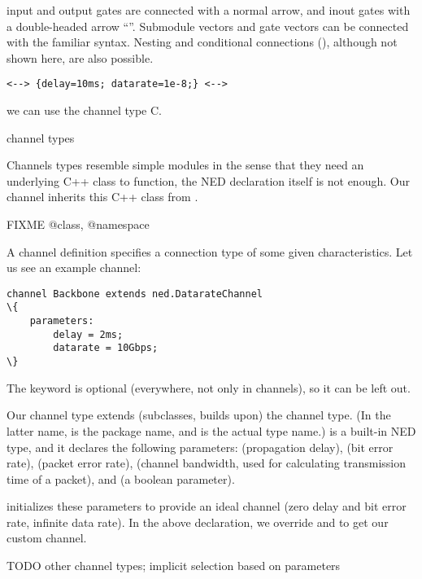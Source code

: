 input and output gates are connected with a normal arrow, and inout gates
with a double-headed arrow ``\ttt{<-->}''. Submodule vectors and gate
vectors can be connected with the familiar  syntax. Nesting and
conditional connections (), although not shown here, are also
possible.

\begin{Verbatim}
<--> {delay=10ms; datarate=1e-8;} <-->
\end{Verbatim}

we can use the channel type C.

channel types

Channels types resemble simple modules in the sense that they need an underlying
C++ class to function, the NED declaration itself is not enough. Our
 channel inherits this C++ class from .

FIXME @class, @namespace

A channel definition specifies a connection type of some given characteristics.
Let us see an example channel:

\begin{Verbatim}[commandchars=\\\{\}]
channel Backbone extends ned.DatarateChannel
\{
    parameters:
        delay = 2ms;
        datarate = 10Gbps;
\}
\end{Verbatim}

\begin{note}
    The  keyword is optional (everywhere, not only in
    channels), so it can be left out.
\end{note}

Our  channel type extends (subclasses, builds upon) the
 channel type. (In the latter name,  is the
package name, and  is the actual type name.)
 is a built-in NED type, and it declares the
following parameters:  (propagation delay),  (bit error rate),
 (packet error rate),  (channel bandwidth, used for
calculating transmission time of a packet), and  (a boolean parameter).

 initializes these parameters to provide an ideal channel
(zero delay and bit error rate, infinite data rate). In the above
declaration, we override  and  to get our custom
channel.

TODO other channel types; implicit selection based on parameters

